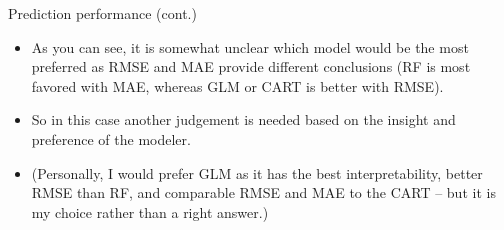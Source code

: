 \begin{frame}{Prediction performance (cont.)}
\begin{itemize}
  \item As you can see, it is somewhat unclear which model would be the most preferred as RMSE and MAE provide different conclusions (RF is most favored with MAE, whereas GLM or CART is better with RMSE).
  \item So in this case another judgement is needed based on the insight and preference of the modeler.
  \item (Personally, I would prefer GLM as it has the best interpretability, better RMSE than RF, and comparable RMSE and MAE to the CART -- but it is my choice rather than a right answer.)
\end{itemize}
\end{frame}
